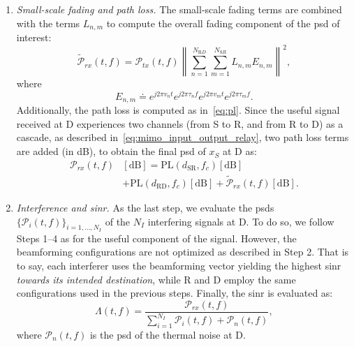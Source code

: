 \begin{enumerate}
\item \emph{Small-scale fading and path loss.}
The small-scale fading terms are combined with the terms $L_{n, m}$ to compute the overall fading component of the \gls{psd} of interest:
\begin{equation}
	\mathcal{\tilde{P}}_{rx}(t, f) = \mathcal{P}_{t x}(t, f) \left\lVert \sum_{n=1}^{N_{\mathrm RD}} \sum_{m=1}^{N_{\mathrm SR}} L_{n, m} E_{n, m}  \right\rVert^2,
\end{equation}
where
\begin{equation}
E_{n, m} \doteq e^{j 2 \pi v_{n} t} e^{j 2 \pi \tau_{n} f} e^{j 2 \pi v_{m} t} e^{j 2 \pi \tau_{m} f}.
\end{equation}
Additionally, the path loss is computed as in~\eqref{eq:pl}. Since the useful signal received at D experiences two channels (from S to R, and from R to D) as a cascade, as described in~\eqref{eq:mimo_input_output_relay}, two path loss terms are added (in dB), to obtain the final \gls{psd} of $x_S$ at D as:
\begin{equation}
\begin{split}
\mathcal{P}_{r x}(t, f)& [\mathrm{dB}]  = \text{PL} (d_{\mathrm{SR}}, f_c) [\mathrm{dB}] \\
& + \text{PL} (d_{\mathrm{RD}}, f_c) [\mathrm{dB}] + \mathcal{\tilde{P}}_{rx}(t, f) [\mathrm{dB}].
\end{split}
\end{equation}
\item \emph{Interference and \gls{sinr}.}
As the last step, we evaluate the \glspl{psd} $\{ \mathcal{P}_{i}(t, f) \}_{i = 1, \dots, N_I}$ of the $N_I$ interfering signals at D. %
To do so, we follow Steps 1--4 as for the useful component of the signal. However, the beamforming configurations are not optimized as described in Step 2. That is to say, each interferer uses the beamforming vector yielding the highest \gls{sinr} \emph{towards its intended destination}, while R and D employ the same configurations used in the previous steps.
Finally, the \gls{sinr} is evaluated as:
\[ \Lambda (t, f) = \frac{ \mathcal{P}_{r x}(t, f)} {\sum_{i=1}^{N_I} \mathcal{P}_{i}(t, f) + \mathcal{P}_{n}(t, f) },  \]
where $\mathcal{P}_{n}(t, f)$ is the \gls{psd} of the thermal noise at D.
\end{enumerate}

